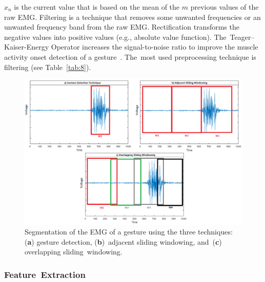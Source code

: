 \documentclass[sensors,review,accept,moreauthors,pdftex]{Definitions/mdpi}
\begin{document}
\begin{math}
x_n
\end{math}
is the current value that is based on the mean of the 
\begin{math}
m
\end{math} previous values of the raw EMG. Filtering is a technique that removes some unwanted frequencies or an unwanted frequency band from the raw EMG. Rectification transforms the negative values into positive values (e.g., absolute value function). The~Teager--Kaiser-Energy Operator increases the signal-to-noise ratio to improve the muscle activity onset detection of a gesture~\cite{li2007teager}. The~most used preprocessing technique is filtering (see Table~\ref{tab:8}).








\begin{figure}[H]
	\centering
	\includegraphics[width=\linewidth]{Windowing}
	\caption{Segmentation of the EMG of a gesture using the three techniques: (\textbf{a}) gesture detection, (\textbf{b})~adjacent sliding windowing, and~(\textbf{c}) overlapping sliding~windowing.}
	\label{fig:4}

\end{figure}




















\subsubsection{Feature~Extraction} \label{feat}
\end{document}
